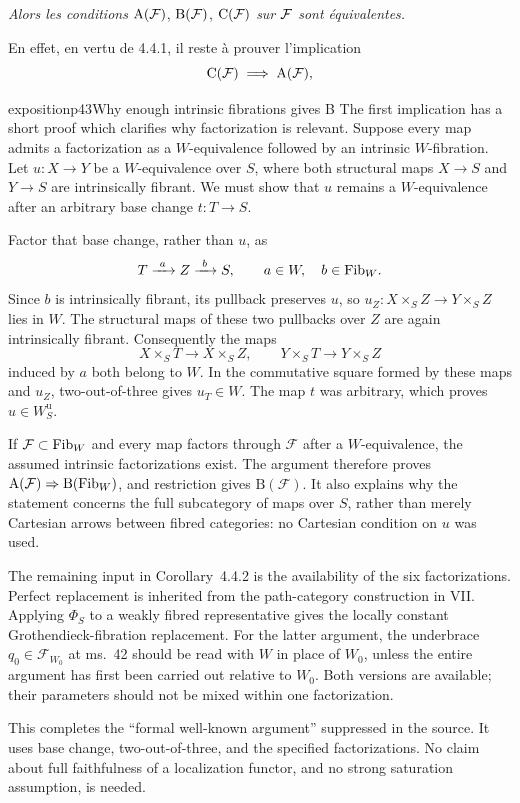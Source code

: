 \noindent\textit{Alors les conditions} $\mathrm{A}(\mathcal{F})$, $\mathrm{B}(\mathcal{F})$, $\mathrm{C}(\mathcal{F})$ \textit{sur $\mathcal{F}$ sont équivalentes.}

En effet, en vertu de 4.4.1, il reste à prouver l'implication
\[
\mathrm{C}(\mathcal{F}) \;\Longrightarrow\; \mathrm{A}(\mathcal{F}),
\]


\begin{dcomment}{exposition}{p43}{Why enough intrinsic fibrations gives B}
The first implication has a short proof which clarifies why factorization is relevant. Suppose every map admits a factorization as a $W$-equivalence followed by an intrinsic $W$-fibration. Let $u:X\to Y$ be a $W$-equivalence over $S$, where both structural maps $X\to S$ and $Y\to S$ are intrinsically fibrant. We must show that $u$ remains a $W$-equivalence after an arbitrary base change $t:T\to S$.

Factor that base change, rather than $u$, as
\[
 T\xrightarrow{\ a\ }Z\xrightarrow{\ b\ }S,
 \qquad a\in W,\quad b\in\Fib_W.
\]
Since $b$ is intrinsically fibrant, its pullback preserves $u$, so $u_Z:X\times_SZ\to Y\times_SZ$ lies in $W$. The structural maps of these two pullbacks over $Z$ are again intrinsically fibrant. Consequently the maps
\[
 X\times_ST\longrightarrow X\times_SZ,
 \qquad Y\times_ST\longrightarrow Y\times_SZ
\]
induced by $a$ both belong to $W$. In the commutative square formed by these maps and $u_Z$, two-out-of-three gives $u_T\in W$. The map $t$ was arbitrary, which proves $u\in W_S^{\mathrm u}$.

If $\mathcal F\subset\mathrm{Fib}_W$ and every map factors through $\mathcal F$ after a $W$-equivalence, the assumed intrinsic factorizations exist. The argument therefore proves $\mathrm A(\mathcal F)\Rightarrow\mathrm B(\mathrm{Fib}_W)$, and restriction gives $\mathrm B(\mathcal F)$. It also explains why the statement concerns the full subcategory of maps over $S$, rather than merely Cartesian arrows between fibred categories: no Cartesian condition on $u$ was used.

The remaining input in Corollary~4.4.2 is the availability of the six factorizations. Perfect replacement is inherited from the path-category construction in VII. Applying $\Phi_S$ to a weakly fibred representative gives the locally constant Grothendieck-fibration replacement. For the latter argument, the underbrace $q_0\in\mathcal F_{W_0}$ at ms.~42 should be read with $W$ in place of $W_0$, unless the entire argument has first been carried out relative to $W_0$. Both versions are available; their parameters should not be mixed within one factorization.

This completes the ``formal well-known argument'' suppressed in the source. It uses base change, two-out-of-three, and the specified factorizations. No claim about full faithfulness of a localization functor, and no strong saturation assumption, is needed.
\end{dcomment}


